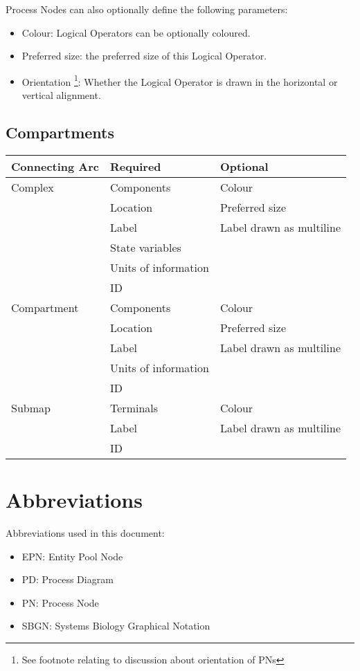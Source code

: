 \documentclass[11pt]{article}
\begin{document}
Process Nodes can also optionally define the following parameters:
\begin{itemize}
\item Colour: Logical Operators can be optionally coloured.
\item Preferred size: the preferred size of this Logical Operator.
\item Orientation \footnote{See footnote relating to discussion about orientation of PNs}: Whether the Logical Operator is drawn in the horizontal or vertical alignment.
\end{itemize}

\subsection{Compartments}
\label{compartment_params}

\begin{table}[H]
   \centering
   \begin{tabular*}{0.95\textwidth}{ l l l   }
      \toprule
      \toprule
      \textbf{Connecting Arc}    		& \textbf{Required} 			&  \textbf{Optional} \\
     \midrule
     \midrule
      Complex			& Components		& Colour	\\
  					& Location		& Preferred size \\
     				      	& Label 			& Label drawn as multiline\\
       				      	& State variables 	&  \\
       				      	& Units of information &  \\
					& ID				& \\
     \midrule
      Compartment		& Components		& Colour	\\
  					& Location		& Preferred size \\
     				      	& Label 			& Label drawn as multiline\\
       				      	& Units of information &  \\
					& ID				& \\
     \midrule
      Submap			& Terminals		& Colour	\\
     				      	& Label 			& Label drawn as multiline\\
					& ID				& \\
    \bottomrule
   \end{tabular*}
   \label{tab:compartment_specs}
\end{table}




\section{Abbreviations}

Abbreviations used in this document:

\begin{itemize}
\item EPN: Entity Pool Node
\item PD: Process Diagram
\item PN: Process Node
\item SBGN: Systems Biology Graphical Notation
\end{itemize}
\end{document}
